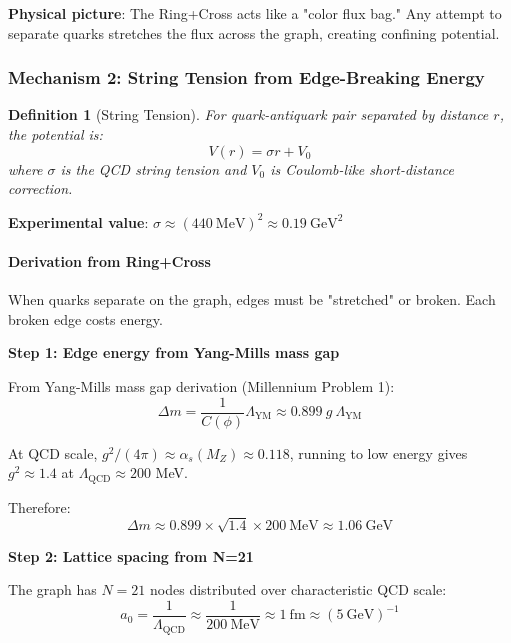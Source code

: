 \documentclass[12pt,a4paper]{article}
\newtheorem{definition}[theorem]{Definition}
\begin{document}
\textbf{Physical picture}: The Ring+Cross acts like a "color flux bag." Any attempt to separate quarks stretches the flux across the graph, creating confining potential.

\subsubsection{Mechanism 2: String Tension from Edge-Breaking Energy}

\begin{definition}[String Tension]
For quark-antiquark pair separated by distance $r$, the potential is:
\begin{equation}
V(r) = \sigma r + V_0
\end{equation}
where $\sigma$ is the QCD string tension and $V_0$ is Coulomb-like short-distance correction.
\end{definition}

\textbf{Experimental value}: $\sigma \approx (440\ \mathrm{MeV})^2 \approx 0.19\ \mathrm{GeV}^2$

\paragraph{Derivation from Ring+Cross}

When quarks separate on the graph, edges must be "stretched" or broken. Each broken edge costs energy.

\textbf{Step 1: Edge energy from Yang-Mills mass gap}

From Yang-Mills mass gap derivation (Millennium Problem 1):
\begin{equation}
\Delta m = \frac{1}{C(\phi)} \Lambda_{\mathrm{YM}} \approx 0.899\ g\ \Lambda_{\mathrm{YM}}
\end{equation}

At QCD scale, $g^2/(4\pi) \approx \alpha_s(M_Z) \approx 0.118$, running to low energy gives $g^2 \approx 1.4$ at $\Lambda_{\mathrm{QCD}} \approx 200$ MeV.

Therefore:
\begin{equation}
\Delta m \approx 0.899 \times \sqrt{1.4} \times 200\ \mathrm{MeV} \approx 1.06\ \mathrm{GeV}
\end{equation}

\textbf{Step 2: Lattice spacing from N=21}

The graph has $N=21$ nodes distributed over characteristic QCD scale:
\begin{equation}
a_0 = \frac{1}{\Lambda_{\mathrm{QCD}}} \approx \frac{1}{200\ \mathrm{MeV}} \approx 1\ \mathrm{fm} \approx (5\ \mathrm{GeV})^{-1}
\end{equation}
\end{document}
